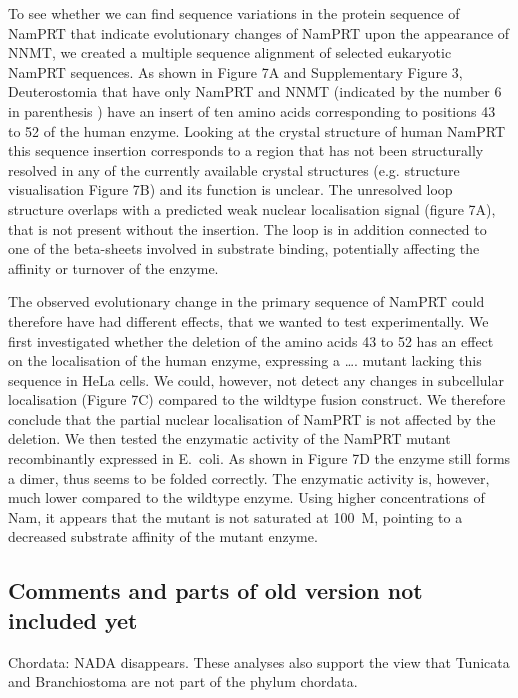 \documentclass[paper=a4, 12pt]{scrartcl}
\begin{document}
To see whether we can find sequence variations in the protein sequence of NamPRT that indicate evolutionary changes of NamPRT upon the appearance of NNMT, we created a multiple sequence alignment of selected eukaryotic NamPRT sequences. As shown in Figure 7A and Supplementary Figure 3, Deuterostomia that have only NamPRT and NNMT (indicated by the number 6 in parenthesis ) have an insert of ten amino acids corresponding to positions 43 to 52 of the human enzyme. Looking at the crystal structure of human NamPRT this sequence insertion corresponds to a region that has not been structurally resolved in any of the currently available crystal structures (e.g. \cite{Wang2006} structure visualisation Figure 7B) and its function is unclear. The unresolved loop structure overlaps with a predicted weak nuclear localisation signal (figure 7A), that is not present without the insertion. The loop is in addition connected to one of the beta-sheets involved in substrate binding, potentially affecting the affinity or turnover of the enzyme.

The observed evolutionary change in the primary sequence of NamPRT could therefore have had different effects, that we wanted to test experimentally. We first investigated whether the deletion of the amino acids 43 to 52 has an effect on the localisation of the human enzyme, expressing a …. mutant lacking this sequence in HeLa cells. We could, however, not detect any changes in subcellular localisation (Figure 7C) compared to the wildtype fusion construct. We therefore conclude that the partial nuclear localisation of NamPRT is not affected by the deletion. We then tested the enzymatic activity of the NamPRT mutant recombinantly expressed in E. coli. As shown in Figure 7D the enzyme still forms a dimer, thus seems to be folded correctly. The enzymatic activity is, however, much lower compared to the wildtype enzyme. Using higher concentrations of Nam, it appears that the mutant is not saturated at 100 \textmu M, pointing to a decreased substrate affinity of the mutant enzyme.

\subsection{Comments and parts of old version not included yet}

Chordata: NADA disappears. These analyses also support the view that Tunicata and Branchiostoma are not part of the phylum chordata.
\end{document}
